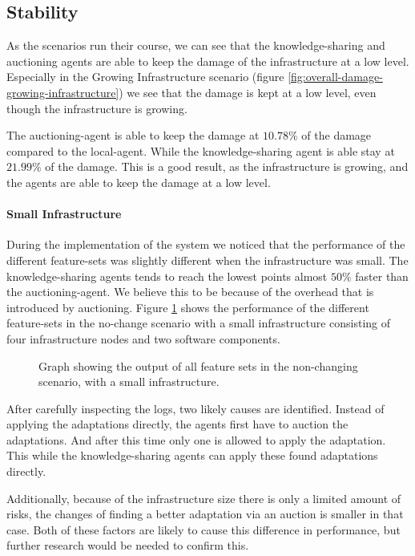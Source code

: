 \subsection{Stability}
\label{ssec:stability}
As the scenarios run their course, we can see that the knowledge-sharing and auctioning agents are able to keep the damage of the infrastructure at a low level. Especially in the Growing Infrastructure scenario (figure \ref{fig:overall-damage-growing-infrastructure}) we see that the damage is kept at a low level, even though the infrastructure is growing. 

The auctioning-agent is able to keep the damage at $10.78\%$ of the damage compared to the local-agent. While the knowledge-sharing agent is able stay at $21.99\%$ of the damage. This is a good result, as the infrastructure is growing, and the agents are able to keep the damage at a low level.

\paragraph*{Small Infrastructure}
During the implementation of the system we noticed that the performance of the different feature-sets was slightly different when the infrastructure was small. The knowledge-sharing agents tends to reach the lowest points almost $50\%$ faster than the auctioning-agent. We believe this to be because of the overhead that is introduced by auctioning. Figure \ref{fig:small-infra-no-change} shows the performance of the different feature-sets in the no-change scenario with a small infrastructure consisting of four infrastructure nodes and two software components.

\begin{figure}[H]
    \centering
        
    \caption{Graph showing the output of all feature sets in the non-changing scenario, with a small infrastructure.}
    \label{fig:small-infra-no-change}
\end{figure}

After carefully inspecting the logs, two likely causes are identified. Instead of applying the adaptations directly, the agents first have to auction the adaptations. And after this time only one is allowed to apply the adaptation. This while the knowledge-sharing agents can apply these found adaptations directly. 

Additionally, because of the infrastructure size there is only a limited amount of risks, the changes of finding a better adaptation via an auction is smaller in that case. Both of these factors are likely to cause this difference in performance, but further research would be needed to confirm this.

